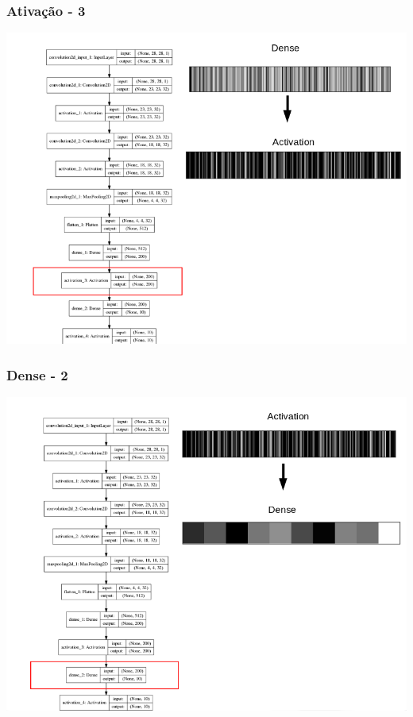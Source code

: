 \documentclass[tikz,10pt]{beamer}
\begin{document}
\begin{frame}
	\frametitle{Ativação - 3}
	\centering
	\includegraphics[height=.8\paperheight]{images/fabio/ativ_3}
\end{frame}

\begin{frame}
	\frametitle{Dense - 2}
	\centering
	\includegraphics[height=.8\paperheight]{images/fabio/dense2}
\end{frame}
\end{document}
